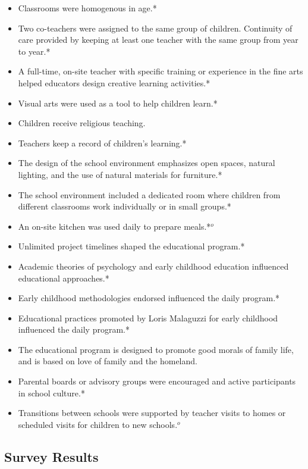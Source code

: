 \begin{itemize}
\begin{itemize}
 	\item Classrooms were homogenous in age.*
 	\item Two co-teachers were assigned to the same group of children. Continuity of care provided by keeping at least one teacher with the same group from year to year.*
 	\item A full-time, on-site teacher with specific training or experience in the fine arts helped educators design creative learning activities.*
 	\item Visual arts were used as a tool to help children learn.*
 	\item Children receive religious teaching.
 	\item Teachers keep a record of children's learning.*
 	\item The design of the school environment emphasizes open spaces, natural lighting, and the use of natural materials for furniture.*
 	\item The school environment included a dedicated room where children from different classrooms work individually or in small groups.*
 	\item An on-site kitchen was used daily to prepare meals.*$^o$
 	\item Unlimited project timelines shaped the educational program.*
 	\item Academic theories of psychology and early childhood education influenced educational approaches.*
 	\item Early childhood methodologies endorsed influenced the daily program.*
 	\item Educational practices promoted by Loris Malaguzzi for early childhood influenced the daily program.*
 	\item The educational program is designed to promote good morals of family life, and is based on love of family and the homeland.
 	\item Parental boards or advisory groups were encouraged and active participants in school culture.*
	\item Transitions between schools were supported by teacher visits to homes or scheduled visits for children to new schools.$^o$
 \end{itemize}
 \end{itemize}
 
 \subsection{Survey Results}
 
